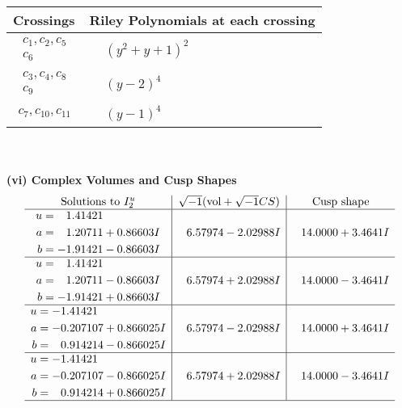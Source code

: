 \documentclass[1p]{elsarticle_modified}
\theoremstyle{definition}
\newcommand{\I}{\sqrt{-1}}
\begin{document}
\begin{tabular}{m{50pt}|m{274pt}}
Crossings & \hspace{64pt}Riley Polynomials at each crossing \\
\hline $$\begin{aligned}c_{1},c_{2},c_{5}\\c_{6}\end{aligned}$$&$\begin{aligned}
&(y^2+y+1)^2
\end{aligned}$\\
\hline $$\begin{aligned}c_{3},c_{4},c_{8}\\c_{9}\end{aligned}$$&$\begin{aligned}
&(y-2)^4
\end{aligned}$\\
\hline $$\begin{aligned}c_{7},c_{10},c_{11}\end{aligned}$$&$\begin{aligned}
&(y-1)^4
\end{aligned}$\\
\hline
\end{tabular}\\~\\
\newpage\flushleft \textbf{(vi) Complex Volumes and Cusp Shapes}
$$\begin{array}{c|c|c}  
\text{Solutions to }I^u_{2}& \I (\text{vol} + \sqrt{-1}CS) & \text{Cusp shape}\\
 \hline 
\begin{aligned}
u &= \phantom{-}1.41421\phantom{ +0.000000I} \\
a &= \phantom{-}1.20711 + 0.86603 I \\
b &= -1.91421 - 0.86603 I\end{aligned}
 & \phantom{-}6.57974 - 2.02988 I & \phantom{-}14.0000 + 3.4641 I \\ \hline\begin{aligned}
u &= \phantom{-}1.41421\phantom{ +0.000000I} \\
a &= \phantom{-}1.20711 - 0.86603 I \\
b &= -1.91421 + 0.86603 I\end{aligned}
 & \phantom{-}6.57974 + 2.02988 I & \phantom{-}14.0000 - 3.4641 I \\ \hline\begin{aligned}
u &= -1.41421\phantom{ +0.000000I} \\
a &= -0.207107 + 0.866025 I \\
b &= \phantom{-}0.914214 - 0.866025 I\end{aligned}
 & \phantom{-}6.57974 - 2.02988 I & \phantom{-}14.0000 + 3.4641 I \\ \hline\begin{aligned}
u &= -1.41421\phantom{ +0.000000I} \\
a &= -0.207107 - 0.866025 I \\
b &= \phantom{-}0.914214 + 0.866025 I\end{aligned}
 & \phantom{-}6.57974 + 2.02988 I & \phantom{-}14.0000 - 3.4641 I\\
 \hline 
 \end{array}$$\newpage\newpage\renewcommand{\arraystretch}{1}
\end{document}
